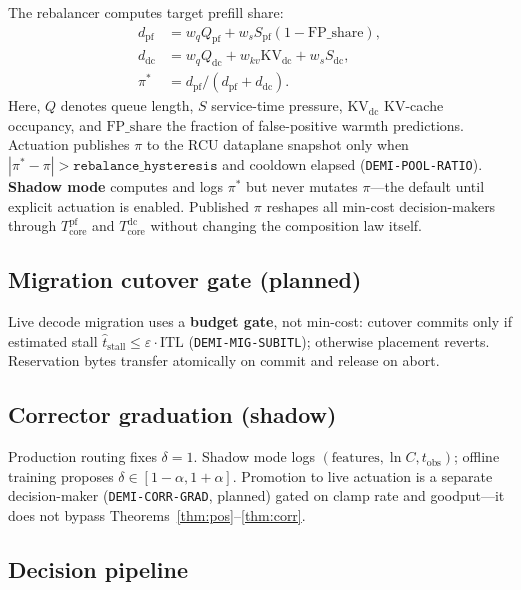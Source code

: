 \documentclass[11pt,a4paper]{article}
\begin{document}
The rebalancer computes target prefill share:
\begin{align*}
  d_{\mathrm{pf}} &= w_q Q_{\mathrm{pf}} + w_s S_{\mathrm{pf}}(1 - \mathrm{FP\_share}), \\
  d_{\mathrm{dc}} &= w_q Q_{\mathrm{dc}} + w_{kv} \mathrm{KV}_{\mathrm{dc}} + w_s S_{\mathrm{dc}}, \\
  \pi^* &= d_{\mathrm{pf}} / (d_{\mathrm{pf}} + d_{\mathrm{dc}}).
\end{align*}
Here, $Q$ denotes queue length, $S$ service-time pressure, $\mathrm{KV}_{\mathrm{dc}}$
KV-cache occupancy, and $\mathrm{FP\_share}$ the fraction of false-positive warmth
predictions.
Actuation publishes $\pi$ to the RCU dataplane snapshot only when
$|\pi^* - \pi| > \texttt{rebalance\_hysteresis}$ and cooldown elapsed
(\texttt{DEMI-POOL-RATIO}).
\textbf{Shadow mode} computes and logs $\pi^*$ but never mutates $\pi$---the
default until explicit actuation is enabled.
Published $\pi$ reshapes all min-cost decision-makers through
$T_{\mathrm{core}}^{\mathrm{pf}}$ and $T_{\mathrm{core}}^{\mathrm{dc}}$ without
changing the composition law itself.

\subsection{Migration cutover gate (planned)}

Live decode migration uses a \textbf{budget gate}, not min-cost:
cutover commits only if estimated stall
$\widehat{t}_{\mathrm{stall}} \le \varepsilon \cdot \mathrm{ITL}$
(\texttt{DEMI-MIG-SUBITL}); otherwise placement reverts.
Reservation bytes transfer atomically on commit and release on abort.

\subsection{Corrector graduation (shadow)}

Production routing fixes $\delta = 1$.
Shadow mode logs $(\text{features}, \ln C, t_{\mathrm{obs}})$; offline training
proposes $\delta \in [1-\alpha, 1+\alpha]$.
Promotion to live actuation is a separate decision-maker
(\texttt{DEMI-CORR-GRAD}, planned) gated on clamp rate and goodput---it does
not bypass Theorems~\ref{thm:pos}--\ref{thm:corr}.

\subsection{Decision pipeline}
\end{document}
